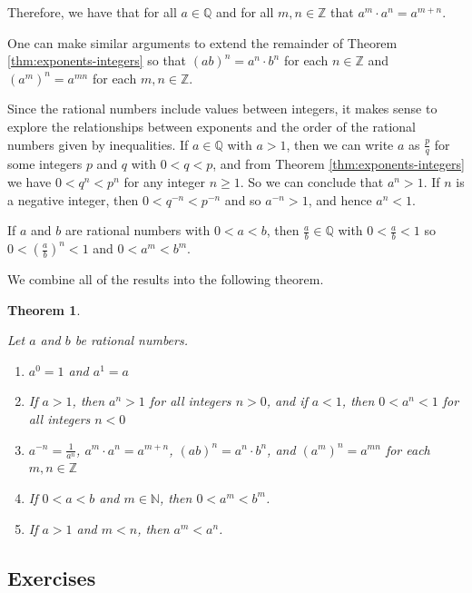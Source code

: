 \documentclass[
]{book}
\newtheorem{theorem}{Theorem}[chapter]
\theoremstyle{definition}
\theoremstyle{definition}
\theoremstyle{definition}
\theoremstyle{definition}
\theoremstyle{remark}
\begin{document}
Therefore, we have that for all \(a\in \mathbb{Q}\) and for all \(m,n\in \mathbb{Z}\) that \(a^m\cdot a^n = a^{m+n}\).

One can make similar arguments to extend the remainder of Theorem \ref{thm:exponents-integers} so that \((ab)^n=a^n\cdot b^n\) for each \(n\in \mathbb{Z}\) and \((a^m)^n = a^{mn}\) for each \(m,n\in \mathbb{Z}\).

Since the rational numbers include values between integers, it makes sense to explore the relationships between exponents and the order of the rational numbers given by inequalities. If \(a\in \mathbb{Q}\) with \(a>1\), then we can write \(a\) as \(\frac{p}{q}\) for some integers \(p\) and \(q\) with \(0<q<p\), and from Theorem \ref{thm:exponents-integers} we have \(0<q^n<p^n\) for any integer \(n\geq 1\). So we can conclude that \(a^n>1\). If \(n\) is a negative integer, then \(0<q^{-n}<p^{-n}\) and so \(a^{-n} >1\), and hence \(a^n<1\).

If \(a\) and \(b\) are rational numbers with \(0<a<b\), then \(\frac{a}{b}\in \mathbb{Q}\) with \(0<\frac{a}{b}<1\) so \(0<\left(\frac{a}{b}\right)^n<1\) and \(0<a^m<b^m\).

We combine all of the results into the following theorem.

\begin{theorem}
\protect\hypertarget{thm:exponents-rationals}{}\label{thm:exponents-rationals}

Let \(a\) and \(b\) be rational numbers.

\begin{enumerate}
\def\labelenumi{\arabic{enumi}.}
\item
  \(a^0=1\) and \(a^1=a\)
\item
  If \(a>1\), then \(a^n >1\) for all integers \(n>0\), and if \(a<1\), then \(0<a^n<1\) for all integers \(n<0\)
\item
  \(a^{-n} = \frac{1}{a^n}\), \(a^m\cdot a^n = a^{m+n}\), \((ab)^n=a^n\cdot b^n\), and \((a^m)^n = a^{mn}\) for each \(m,n\in \mathbb{Z}\)
\item
  If \(0<a<b\) and \(m\in \mathbb{N}\), then \(0<a^m<b^m\).
\item
  If \(a>1\) and \(m<n\), then \(a^m<a^n\).
\end{enumerate}

\end{theorem}

\hypertarget{exercises-12}{%
\subsection{Exercises}\label{exercises-12}}
\end{document}
